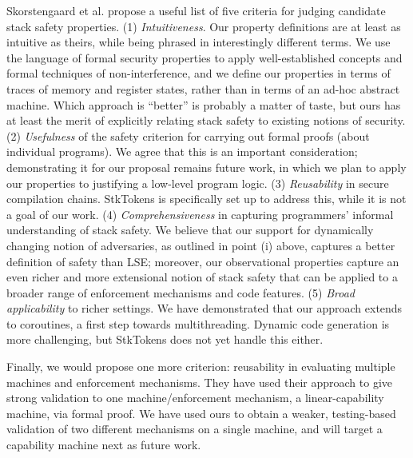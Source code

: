 \documentclass[10pt,conference]{ieeetran}%
\theoremstyle{definition}
\begin{document}
{\begin{enumerate}[label=(\roman*)]
\end{enumerate}

Skorstengaard et al. \cite{SkorstengaardSTKJFP} propose a useful list of five criteria for judging
candidate stack safety properties.
%
(1) {\em Intuitiveness}. Our property definitions are at least as
intuitive as theirs, while being phrased in interestingly different terms.
We use the language of formal security
properties to apply well-established concepts and formal techniques
of non-interference, and we define our properties in terms of
traces of memory and register states, rather than in terms of an
ad-hoc abstract machine.
Which approach is ``better'' is probably a matter of taste, but ours
has at least the merit of explicitly relating stack safety to existing
notions of security.
%
(2) {\em Usefulness} of the safety criterion
for carrying out formal proofs (about individual programs). We agree that this is an important consideration;
demonstrating it for our proposal remains future work, in which we
plan to apply our properties to justifying a low-level program logic.
%
(3) {\em Reusability} in secure compilation chains.
StkTokens
is specifically set up to address this,
while it is not a goal of
our work.
%
(4) {\em Comprehensiveness} in capturing programmers' informal
understanding of stack safety. We believe that our support
for dynamically changing notion of adversaries, as outlined in point (i) above,
captures a better definition of safety than LSE; moreover, our observational
properties capture an even richer and more extensional notion of stack safety
that can be applied to a broader range of enforcement mechanisms and code features.
%
(5) {\em Broad applicability} to richer settings. We have demonstrated that our approach extends to
coroutines, a first step towards multithreading. Dynamic code generation is
more challenging, but StkTokens does not yet handle this either.

Finally, we would propose one more criterion: reusability in evaluating multiple machines and
enforcement mechanisms. They have used their approach to give strong validation
to one machine/enforcement mechanism, a linear-capability machine,
via formal proof. We have used ours to obtain a weaker, testing-based validation of
two different mechanisms on a single machine, and will target a capability machine
next as future work.

}
\end{document}
